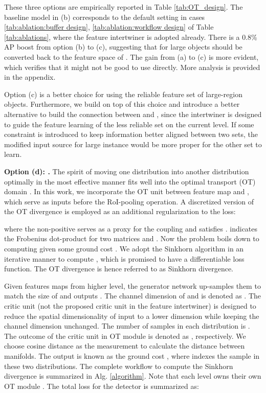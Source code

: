 \documentclass{article} \usepackage{iclr2019_conference,times}
\begin{document}
These three options are empirically reported 
in Table \ref{tab:OT_design}. 
The baseline model in (b) corresponds to the default setting in cases \ref{tab:ablation:buffer design}, \ref{tab:ablation:workflow design} of Table \ref{tab:ablations}, where the feature intertwiner is adopted already.
There is a 0.8\% AP boost from option (b) to (c), suggesting 
that  for large objects should be converted back to the feature space of . The gain from (a) to (c) is more evident, which verifies that it might not be good to use  directly.
More analysis is provided in the appendix.






Option (c) is a better choice for using the reliable feature set of large-region objects. Furthermore, we build on top of this choice and introduce a better alternative to build the connection between  and , since the  intertwiner is designed to guide the feature learning of the less reliable set on the current level. 
If some constraint is introduced to keep information better aligned between two sets, the modified input source  for large instance would be more proper for the other set to learn. 

\textbf{Option (d): {}.} The spirit of moving one distribution into another distribution optimally in the most effective manner fits well into the optimal transport (OT) domain \citep{peyre2018_ot_recent_book}. In this work, we incorporate the OT unit between feature map  and , which serve as inputs before the RoI-pooling operation.
A discretized version \citep{genevay2017_sinkhorn_loss,cuturi2013_regularized_OT} of the OT divergence is employed as an additional regularization to the loss:

where the non-positive   serves as a proxy for the coupling and satisfies .  indicates the Frobenius dot-product for two matrices and .
Now the problem boils down to computing  given some ground cost .
We adopt the Sinkhorn algorithm \citep{sinkhorn1964_first} in an iterative manner to compute , which is promised to have a differentiable loss function. The OT divergence is hence referred to as Sinkhorn divergence.



Given features maps  from higher level, the generator network  up-samples {them} to match the size of  and outputs . The channel dimension of  and  is denoted as .
The critic unit  (not the proposed critic unit in the feature intertwiner) is designed to reduce the spatial dimensionality of input to  a lower dimension  while keeping the channel dimension unchanged. The number of samples in each distribution is . 
The outcome of the critic unit in OT module is denoted as , respectively.
We choose cosine distance as the measurement to calculate the distance between manifolds. 
The output is known as the ground cost , where  indexes the sample in these two distributions. The complete workflow to compute the Sinkhorn divergence is summarized in Alg. \ref{algorithm}. 
Note that each level owns their own OT module 
. 
The total loss for the detector is summarized as:
\end{document}
